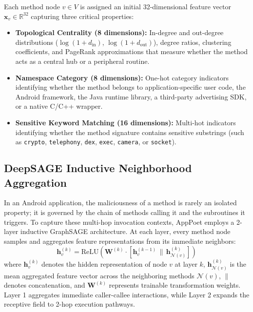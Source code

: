 \documentclass[12pt,a4paper,oneside]{report}
\begin{document}
Each method node $v \in V$ is assigned an initial 32-dimensional feature vector $\mathbf{x}_v \in \mathbb{R}^{32}$ capturing three critical properties:
\begin{itemize}
    \item \textbf{Topological Centrality (8 dimensions):} In-degree and out-degree distributions ($\log(1 + d_{\text{in}})$, $\log(1 + d_{\text{out}})$), degree ratios, clustering coefficients, and PageRank approximations that measure whether the method acts as a central hub or a peripheral routine.
    \item \textbf{Namespace Category (8 dimensions):} One-hot category indicators identifying whether the method belongs to application-specific user code, the Android framework, the Java runtime library, a third-party advertising SDK, or a native C/C++ wrapper.
    \item \textbf{Sensitive Keyword Matching (16 dimensions):} Multi-hot indicators identifying whether the method signature contains sensitive substrings (such as \texttt{crypto}, \texttt{telephony}, \texttt{dex}, \texttt{exec}, \texttt{camera}, or \texttt{socket}).
\end{itemize}

\subsection{DeepSAGE Inductive Neighborhood Aggregation}
In an Android application, the maliciousness of a method is rarely an isolated property; it is governed by the chain of methods calling it and the subroutines it triggers. To capture these multi-hop invocation contexts, AppPoet employs a 2-layer inductive GraphSAGE architecture. At each layer, every method node samples and aggregates feature representations from its immediate neighbors:
\begin{equation}
    \mathbf{h}_v^{(k)} = \text{ReLU}\left( \mathbf{W}^{(k)} \cdot \left[ \mathbf{h}_v^{(k-1)} \,\|\, \mathbf{h}_{\mathcal{N}(v)}^{(k)} \right] \right)
\end{equation}
where $\mathbf{h}_v^{(k)}$ denotes the hidden representation of node $v$ at layer $k$, $\mathbf{h}_{\mathcal{N}(v)}^{(k)}$ is the mean aggregated feature vector across the neighboring methods $\mathcal{N}(v)$, $\|$ denotes concatenation, and $\mathbf{W}^{(k)}$ represents trainable transformation weights. Layer 1 aggregates immediate caller-callee interactions, while Layer 2 expands the receptive field to 2-hop execution pathways.
\end{document}
